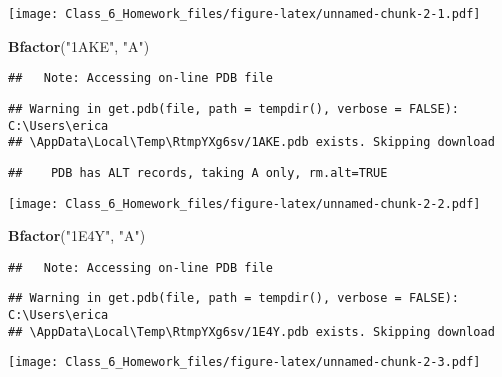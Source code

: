 \documentclass[]{article}
\newenvironment{Shaded}{\begin{snugshade}}{\end{snugshade}}
\newcommand{\KeywordTok}[1]{\textcolor[rgb]{0.13,0.29,0.53}{\textbf{#1}}}
\newcommand{\StringTok}[1]{\textcolor[rgb]{0.31,0.60,0.02}{#1}}
\newcommand{\NormalTok}[1]{#1}
\begin{document}
\texttt{[image: Class\_6\_Homework\_files/figure-latex/unnamed-chunk-2-1.pdf]}

\begin{Shaded}
\begin{Highlighting}[]
\KeywordTok{Bfactor}\NormalTok{(}\StringTok{"1AKE"}\NormalTok{, }\StringTok{"A"}\NormalTok{)}
\end{Highlighting}
\end{Shaded}

\begin{verbatim}
##   Note: Accessing on-line PDB file
\end{verbatim}

\begin{verbatim}
## Warning in get.pdb(file, path = tempdir(), verbose = FALSE): C:\Users\erica
## \AppData\Local\Temp\RtmpYXg6sv/1AKE.pdb exists. Skipping download
\end{verbatim}

\begin{verbatim}
##    PDB has ALT records, taking A only, rm.alt=TRUE
\end{verbatim}

\texttt{[image: Class\_6\_Homework\_files/figure-latex/unnamed-chunk-2-2.pdf]}

\begin{Shaded}
\begin{Highlighting}[]
\KeywordTok{Bfactor}\NormalTok{(}\StringTok{"1E4Y"}\NormalTok{, }\StringTok{"A"}\NormalTok{)}
\end{Highlighting}
\end{Shaded}

\begin{verbatim}
##   Note: Accessing on-line PDB file
\end{verbatim}

\begin{verbatim}
## Warning in get.pdb(file, path = tempdir(), verbose = FALSE): C:\Users\erica
## \AppData\Local\Temp\RtmpYXg6sv/1E4Y.pdb exists. Skipping download
\end{verbatim}

\texttt{[image: Class\_6\_Homework\_files/figure-latex/unnamed-chunk-2-3.pdf]}
\end{document}
